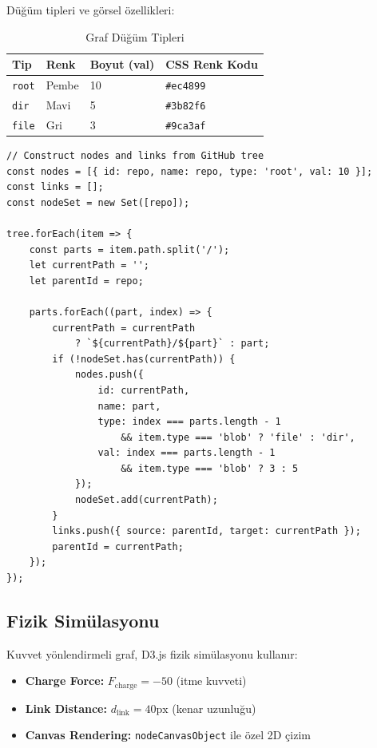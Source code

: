 \documentclass[12pt,a4paper]{article}
\begin{document}
Düğüm tipleri ve görsel özellikleri:
\begin{table}[H]
\centering
\caption{Graf Düğüm Tipleri}
\label{tab:nodes}
\begin{tabular}{@{}llll@{}}
\toprule
\textbf{Tip} & \textbf{Renk} & \textbf{Boyut (val)} & \textbf{CSS Renk Kodu} \\
\midrule
\texttt{root} & Pembe & 10 & \texttt{\#ec4899} \\
\texttt{dir} & Mavi & 5 & \texttt{\#3b82f6} \\
\texttt{file} & Gri & 3 & \texttt{\#9ca3af} \\
\bottomrule
\end{tabular}
\end{table}

\begin{lstlisting}[style=jsstyle, caption={Graf Veri Dönüşüm Algoritması (GitHubGraph.jsx)}, label=lst:graph]
// Construct nodes and links from GitHub tree
const nodes = [{ id: repo, name: repo, type: 'root', val: 10 }];
const links = [];
const nodeSet = new Set([repo]);

tree.forEach(item => {
    const parts = item.path.split('/');
    let currentPath = '';
    let parentId = repo;

    parts.forEach((part, index) => {
        currentPath = currentPath 
            ? `${currentPath}/${part}` : part;
        if (!nodeSet.has(currentPath)) {
            nodes.push({
                id: currentPath,
                name: part,
                type: index === parts.length - 1 
                    && item.type === 'blob' ? 'file' : 'dir',
                val: index === parts.length - 1 
                    && item.type === 'blob' ? 3 : 5
            });
            nodeSet.add(currentPath);
        }
        links.push({ source: parentId, target: currentPath });
        parentId = currentPath;
    });
});
\end{lstlisting}

\subsection{Fizik Simülasyonu}

Kuvvet yönlendirmeli graf, D3.js fizik simülasyonu kullanır:

\begin{itemize}
    \item \textbf{Charge Force:} $F_{\text{charge}} = -50$ (itme kuvveti)
    \item \textbf{Link Distance:} $d_{\text{link}} = 40\text{px}$ (kenar uzunluğu)
    \item \textbf{Canvas Rendering:} \texttt{nodeCanvasObject} ile özel 2D çizim
\end{itemize}
\end{document}
